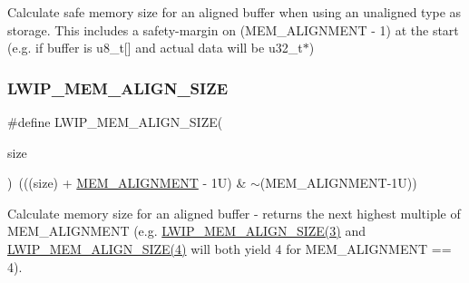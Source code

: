 Calculate safe memory size for an aligned buffer when using an unaligned type as storage. This includes a safety-\/margin on (M\+E\+M\+\_\+\+A\+L\+I\+G\+N\+M\+E\+NT -\/ 1) at the start (e.\+g. if buffer is u8\+\_\+t\mbox{[}\mbox{]} and actual data will be u32\+\_\+t$\ast$) \mbox{\label{group__compiler__abstraction_gaef204be511fd32f681b55abc08e9ae18}} 
\subsubsection{\texorpdfstring{L\+W\+I\+P\+\_\+\+M\+E\+M\+\_\+\+A\+L\+I\+G\+N\+\_\+\+S\+I\+ZE}{LWIP\_MEM\_ALIGN\_SIZE}\hspace{0.1cm}{\footnotesize\ttfamily [1/2]}}
{\footnotesize\ttfamily \#define L\+W\+I\+P\+\_\+\+M\+E\+M\+\_\+\+A\+L\+I\+G\+N\+\_\+\+S\+I\+ZE(\begin{DoxyParamCaption}\item[{}]{size }\end{DoxyParamCaption})~(((size) + \hyperlink{group__lwip__opts__mem_ga97343214666ee6dcb18c0bd77b441ea7}{M\+E\+M\+\_\+\+A\+L\+I\+G\+N\+M\+E\+NT} -\/ 1\+U) \& $\sim$(\+M\+E\+M\+\_\+\+A\+L\+I\+G\+N\+M\+E\+N\+T-\/1\+U))}

Calculate memory size for an aligned buffer -\/ returns the next highest multiple of M\+E\+M\+\_\+\+A\+L\+I\+G\+N\+M\+E\+NT (e.\+g. \hyperlink{group__compiler__abstraction_gaef204be511fd32f681b55abc08e9ae18}{L\+W\+I\+P\+\_\+\+M\+E\+M\+\_\+\+A\+L\+I\+G\+N\+\_\+\+S\+I\+Z\+E(3)} and \hyperlink{group__compiler__abstraction_gaef204be511fd32f681b55abc08e9ae18}{L\+W\+I\+P\+\_\+\+M\+E\+M\+\_\+\+A\+L\+I\+G\+N\+\_\+\+S\+I\+Z\+E(4)} will both yield 4 for M\+E\+M\+\_\+\+A\+L\+I\+G\+N\+M\+E\+NT == 4). \mbox{\label{group__compiler__abstraction_gaef204be511fd32f681b55abc08e9ae18}} 
